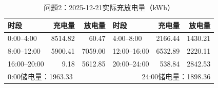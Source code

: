 \begin{table}[H]\centering\small
\caption{问题2：2025-12-21实际充放电量（kWh）}
\label{tab:q2_1221_storage}
\begin{tabular}{lrrlrr}\toprule
时段 & 充电量 & 放电量 & 时段 & 充电量 & 放电量\\\midrule
0:00--4:00 & 8514.82 & 60.47 & 4:00--8:00 & 2166.44 & 1430.21 \\
8:00--12:00 & 5900.41 & 7059.00 & 12:00--16:00 & 6532.89 & 2220.11 \\
16:00--20:00 & 9.18 & 5612.85 & 20:00--24:00 & 538.84 & 2842.53 \\
\midrule\multicolumn{3}{l}{0:00储电量：1963.33} & \multicolumn{3}{r}{24:00储电量：1898.36}\\
\bottomrule\end{tabular}\end{table}
